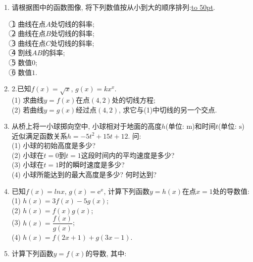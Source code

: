 \documentclass[10pt,a4paper]{article}
\newcommand{\blank}[1]{\underline{\hbox to #1pt{}}}
\begin{document}
\begin{enumerate}[1.]
\item 请根据图中的函数图像, 将下列数值按从小到大的顺序排列:\blank{50}.
\begin{center}
\end{center}
\textcircled{1} 曲线在点$A$处切线的斜率;\\
\textcircled{2} 曲线在点$B$处切线的斜率;\\
\textcircled{3} 曲线在点$C$处切线的斜率;\\
\textcircled{4} 割线$AB$的斜率;\\
\textcircled{5} 数值$0$;\\
\textcircled{6} 数值$1$.
\item 2.已知$f(x)=\sqrt{x}$, $g(x)=kx^x$.\\
(1) 求曲线$y=f(x)$在点$(4,2)$处的切线方程;\\
(2) 若曲线$y=g(x)$经过点$(4,2)$, 求它与(1)中切线的另一个交点.
\item 从桥上将一小球掷向空中, 小球相对于地面的高度$h$(单位: $\text{m}$)和时间$t$(单位: $\text{s}$)近似满足函数关系$h=-5t^2+15t+12$. 问:\\
(1) 小球的初始高度是多少?\\
(2) 小球在$t=0$到$t=1$这段时间内的平均速度是多少?\\
(3) 小球在$t=1$时的瞬时速度是多少?\\
(4) 小球所能达到的最大高度是多少? 何时达到?
\item 已知$f(x)=lnx$, $g(x)=\mathrm{e}^x$, 计算下列函数$y=h(x)$在点$x=1$处的导数值:\\
(1) $h(x)=3f(x)-5g(x)$;\\
(2) $h(x)=f(x)g(x)$;\\
(3) $h(x)=\dfrac{f(x)}{g(x)}$;\\
(4) $h(x)=f(2x+1)+g(3x-1)$.
\item 计算下列函数$y=f(x)$的导数, 其中:\\

\end{enumerate}
\end{document}
